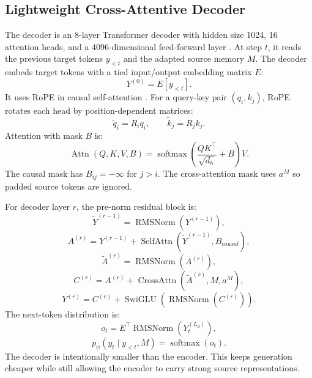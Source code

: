 \documentclass[11pt]{article}
\begin{document}
\subsection{Lightweight Cross-Attentive Decoder}

The decoder is an 8-layer Transformer decoder with hidden size 1024, 16 attention heads, and a 4096-dimensional feed-forward layer \citep{vaswani2017attention}.
At step $t$, it reads the previous target tokens $y_{<t}$ and the adapted source memory $M$.
The decoder embeds target tokens with a tied input/output embedding matrix $E$:
\begin{equation}
Y^{(0)}=E[y_{<t}].
\end{equation}
It uses RoPE in causal self-attention \citep{su2021roformer}.
For a query-key pair $(q_i,k_j)$, RoPE rotates each head by position-dependent matrices:
\begin{equation}
\tilde{q}_i=R_iq_i,
\qquad
\tilde{k}_j=R_jk_j.
\end{equation}
Attention with mask $B$ is:
\begin{equation}
\operatorname{Attn}(Q,K,V,B)
=\operatorname{softmax}\left(\frac{QK^\top}{\sqrt{d_h}}+B\right)V.
\end{equation}
The causal mask has $B_{ij}=-\infty$ for $j>i$.
The cross-attention mask uses $a^M$ so padded source tokens are ignored.

For decoder layer $r$, the pre-norm residual block is:
\begin{equation}
\tilde{Y}^{(r-1)}=\operatorname{RMSNorm}(Y^{(r-1)}),
\end{equation}
\begin{equation}
A^{(r)}=Y^{(r-1)}
+\operatorname{SelfAttn}(\tilde{Y}^{(r-1)},B_{causal}),
\end{equation}
\begin{equation}
\tilde{A}^{(r)}=\operatorname{RMSNorm}(A^{(r)}),
\end{equation}
\begin{equation}
C^{(r)}=A^{(r)}
+\operatorname{CrossAttn}(\tilde{A}^{(r)},M,a^M),
\end{equation}
\begin{equation}
Y^{(r)}=C^{(r)}
+\operatorname{SwiGLU}(\operatorname{RMSNorm}(C^{(r)})).
\end{equation}
The next-token distribution is:
\begin{equation}
o_t=E^\top\operatorname{RMSNorm}(Y^{(L_d)}_t),
\end{equation}
\begin{equation}
p_{\psi}(y_t\mid y_{<t},M)=\operatorname{softmax}(o_t).
\end{equation}
The decoder is intentionally smaller than the encoder.
This keeps generation cheaper while still allowing the encoder to carry strong source representations.
\end{document}
